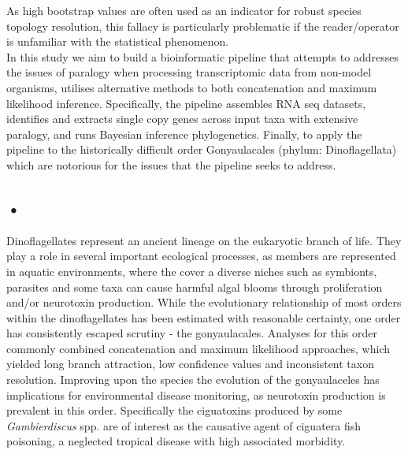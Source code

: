 \documentclass[12pt]{article}
\begin{document}
As high bootstrap values are often used as an indicator for robust species topology resolution, this fallacy is particularly problematic if the reader/operator is unfamiliar with the statistical phenomenon.\\
In this study we aim to build a bioinformatic pipeline that attempts to addresses the issues of paralogy when processing transcriptomic data from non-model organisms, utilises alternative methods to both concatenation and maximum likelihood inference. 
Specifically, the pipeline assembles RNA seq datasets, identifies and extracts single copy genes across input taxa with extensive paralogy, and runs Bayesian inference phylogenetics. 
Finally, to apply the pipeline to the historically difficult order Gonyaulacales (phylum: Dinoflagellata) which are notorious for the issues that the pipeline seeks to address.\\
\subsection*{•}
Dinoflagellates represent an ancient lineage on the eukaryotic branch of life. 
They play a role in several important ecological processes, as members are represented in aquatic environments, where the cover a diverse niches such as symbionts, parasites and some taxa can cause harmful algal blooms through proliferation and/or neurotoxin production.
While the evolutionary relationship of most orders within the dinoflagellates has been estimated with reasonable certainty, one order has consistently escaped scrutiny - the gonyaulacales. 
Analyses for this order commonly combined concatenation and maximum likelihood approaches, which yielded long branch attraction, low confidence values and inconsistent taxon resolution. 
Improving upon the species the evolution of the gonyaulaceles has implications for environmental disease monitoring, as neurotoxin production is prevalent in this order. 
Specifically the ciguatoxins produced by some \emph{Gambierdiscus} spp. are of interest as the causative agent of ciguatera fish poisoning, a neglected tropical disease with high associated morbidity.%
\end{document}
